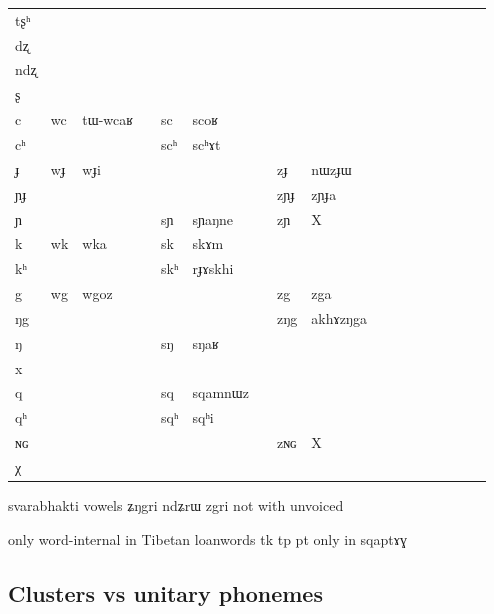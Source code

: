 \documentclass[oldfontcommands,oneside,a4paper,11pt]{article}
\newcommand{\ipa}[1]{{\phon #1}} %
\begin{document}
\begin{table}
\begin{tabular}{l|lll|lll|lll|lllllll}
\ipa{tʂʰ}  &	  &	  &	&	  &	  &	&	  &	  &	&	\\
\ipa{dʐ}  &	  &	  &	&	  &	  &	&	  &	  &	&	\\
\ipa{ndʐ}  &	  &	  &	&	  &	  &	&	  &	  &	&	\\
\ipa{ʂ}  &	  &	  &	&	  &	  &	&	  &	  &	&	\\
\ipa{c}  &	\ipa{wc}  &	\ipa{tɯ-wcaʁ }  &	&	\ipa{sc}  &	\ipa{scoʁ}  &	&	  &	  &	&	\\
\ipa{cʰ}  &	  &	  &	&	\ipa{scʰ}  &	\ipa{scʰɤt}  &	&	  &	  &	&	\\
\ipa{ɟ}  &	\ipa{wɟ}  &	\ipa{wɟi}  &	&	  &	  &	&	\ipa{zɟ}  &	\ipa{nɯzɟɯ}  &	&	\\
\ipa{ɲɟ}  &	  &	  &	&	  &	  &	&	\ipa{zɲɟ}  &	\ipa{zɲɟa}  &	&	\\
\ipa{ɲ}  &	  &	  &	&	\ipa{sɲ}  &	\ipa{sɲaŋne}  &	&	\ipa{zɲ}  &	\ipa{X}  &	&	\\
\ipa{k}  &	\ipa{wk}  &	\ipa{wka}  &	&	\ipa{sk}  &	\ipa{skɤm}  &	&	  &	  &	&	\\
\ipa{kʰ}  &	  &	  &	&	\ipa{skʰ}  &	\ipa{rɟɤskhi}  &	&	  &	  &	&	\\
\ipa{g}  &	\ipa{wg}  &	\ipa{wgoz}  &	&	  &	  &	& 	\ipa{zg}  &	\ipa{zga}  &	&	\\
\ipa{ŋg}  &	  &	  &	&	  &	  &	&	\ipa{zŋg}  &	\ipa{akhɤzŋga}  &	&	\\
\ipa{ŋ}  &	  &	  &	&	\ipa{sŋ}  &	\ipa{sŋaʁ}  &	&	  &	  &	&	\\
\ipa{x}  &	  &	  &	&	  &	  &	&	  &	  &	&	\\
\ipa{q}  &	  &	  &	&	\ipa{sq}  &	\ipa{sqamnɯz}  &	&	  &	  &	&	\\
\ipa{qʰ}  &	  &	  &	&	\ipa{sqʰ}  &	\ipa{sqʰi}  &	&	  &	  &	&	\\
\ipa{ɴɢ}  &	  &	  &	&	  &	  &	&	\ipa{zɴɢ}  &	\ipa{X}  &	&	\\
\ipa{χ}  &	  &	  &	&	  &	  &	&	  &	  &	&	\\
\end{tabular}
\end{table}
 
 
 svarabhakti vowels \ipa{ʑŋgri} \ipa{ndʑrɯ} \ipa{zgri} not with unvoiced
 
 
 
 
 only word-internal in Tibetan loanwords tk tp 
 pt only in \ipa{sqaptɤɣ}
 
 
      \subsection{Clusters vs unitary phonemes} \label{sec:non.clusters}
      
\end{document}
